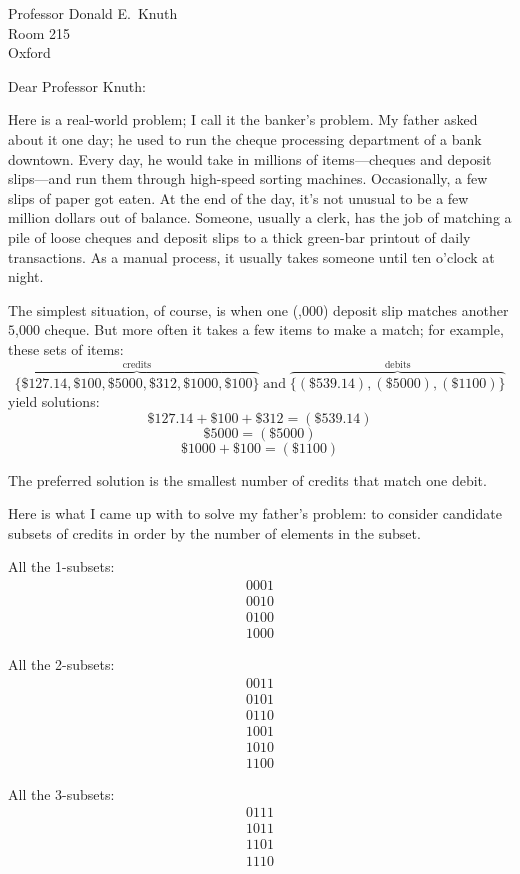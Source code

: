 \documentclass[12pt,a4paper]{letter}
\begin{document}
\begin{letter}{Professor Donald E.~Knuth \\ Room 215 \\ Oxford}

\opening{Dear Professor Knuth:}

Here is a real-world problem; I call it the banker's problem.  My father
asked about it one day; he used to run
the cheque processing department of a bank downtown.  Every day, he would take
in millions of items---cheques and deposit slips---and run them through
high-speed sorting machines.  Occasionally, a few slips of paper got eaten.
At the end of the day, it's not unusual to be a few million
dollars out of balance.
Someone, usually a clerk,
has the job of matching a pile of loose cheques and deposit slips
to a thick green-bar printout of daily transactions.  As a manual process,
it usually takes someone until ten o'clock at night.

The simplest situation, of course, is when one (,000) deposit slip
matches another \textdollar $5$,000 cheque.  But more often it takes
a few items to make a match; for example, these sets of items:
$$
\overbrace{\{\$127.14, \$100, \$5000, \$312, \$1000, \$100\}}^\mathrm{credits}
\;\mathrm{and}\;
\overbrace{\{(\$539.14), (\$5000), (\$1100)\}}^\mathrm{debits}
$$
yield solutions:
$$
\$127.14 + \$100 + \$312 = (\$539.14)
$$
$$
\$5000 = (\$5000)
$$
$$
\$1000 + \$100 = (\$1100)
$$

The preferred solution is the smallest number of credits that match one debit.

Here is what I came up with to solve my father's problem: to consider candidate
subsets of credits in order by the number of elements in the subset.

All the 1-subsets:\begin{eqnarray*}
	0001 \\
	0010 \\
	0100 \\
	1000
\end{eqnarray*}

All the 2-subsets:\begin{eqnarray*}
	0011 \\
	0101 \\
	0110 \\
	1001 \\
	1010 \\
	1100
\end{eqnarray*}

All the 3-subsets: \begin{eqnarray*}
	0111 \\
	1011 \\
	1101 \\
	1110
\end{eqnarray*}


\end{letter}
\end{document}
